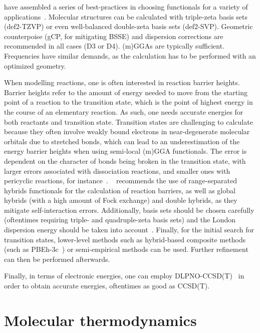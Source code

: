 \citeauthor{Bursch_2022} have assembled a series of best-practices in choosing functionals for a variety of applications~\cite{Bursch_2022}.
Molecular structures can be calculated with triple-zeta basis sets (def2-TZVP)
or even well-balanced double-zeta basis sets (def2-SVP).
Geometric counterpoise (gCP,
for mitigating BSSE) and dispersion corrections are recommended in all cases (D3 or D4).
(m)GGAs are typically sufficient.
Frequencies have similar demands,
as the calculation has to be performed with an optimized geometry.

When modelling reactions,
one is often interested in reaction barrier heights.
Barrier heights refer to the amount of energy needed to move from the starting point of a reaction to the transition state,
which is the point of highest energy in the course of an elementary reaction.
As such,
one needs accurate energies for both reactants and transition state.
Transition states are challenging to calculate because they often involve weakly bound electrons
in near-degenerate molecular orbitals
due to stretched bonds,
which can lead to an underestimation of the energy barrier heights when using semi-local (m)GGA functionals.
The error is dependent on the character of bonds being broken in the transition state,
with larger errors associated with dissociation reactions,
and smaller ones with pericyclic reactions,
for instance~\cite{Bursch_2022}.
\citeauthor{Bursch_2022}~\cite{Bursch_2022} recommends the use of range-separated hybrids functionals for the calculation of reaction barriers,
as well as global hybrids (with a high amount of Fock exchange) and double hybrids,
as they mitigate self-interaction errors.
Additionally,
basis sets should be chosen carefully (oftentimes requiring triple- and quadruple-zeta basis sets) and the London dispersion energy should be taken into account~\cite{Bursch_2022}.
Finally,
for the initial search for transition states,
lower-level methods such as hybrid-based composite methods (such as PBEh-3c~\cite{Grimme_2015}) or semi-empirical methods can be used.
Further refinement can then be performed afterwards.

Finally,
in terms of electronic energies,
one can employ DLPNO-CCSD(T)~\cite{Riplinger_2013,Riplinger_2016}
in order to obtain accurate energies,
oftentimes
as good as CCSD(T).

\section{Molecular thermodynamics}

